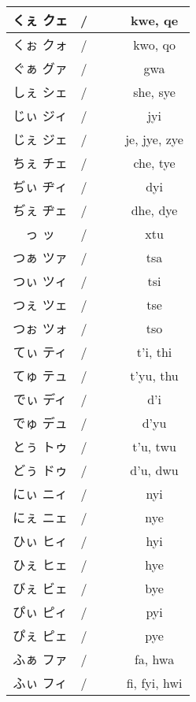\documentclass{article}
\begin{document}
\begin{center}
\begin{japanese}
\begin{longtable}{|c|c c c|c|}
                くぇ クェ & / &&& kwe, qe \\ \hline
                くぉ クォ & / &&& kwo, qo \\ \hline
                ぐぁ グァ & / &&& gwa \\ \hline
                しぇ シェ & / &&& she, sye \\ \hline
                じぃ ジィ & / &&& jyi \\ \hline
                じぇ ジェ & / &&& je, jye, zye \\ \hline
                ちぇ チェ & / &&& che, tye \\ \hline
                ぢぃ ヂィ & / &&& dyi \\ \hline
                ぢぇ ヂェ & / &&& dhe, dye \\ \hline
                っ ッ & / &&& xtu \\ \hline
                つぁ ツァ & / &&& tsa \\ \hline
                つぃ ツィ & / &&& tsi \\ \hline
                つぇ ツェ & / &&& tse \\ \hline
                つぉ ツォ & / &&& tso \\ \hline
                てぃ ティ & / &&& t'i, thi \\ \hline
                てゅ テュ & / &&& t'yu, thu \\ \hline
                でぃ ディ & / &&& d'i \\ \hline
                でゅ デュ & / &&& d'yu \\ \hline
                とぅ トゥ & / &&& t'u, twu \\ \hline
                どぅ ドゥ & / &&& d'u, dwu \\ \hline
                にぃ ニィ & / &&& nyi \\ \hline
                にぇ ニェ & / &&& nye \\ \hline
                ひぃ ヒィ & / &&& hyi \\ \hline
                ひぇ ヒェ & / &&& hye \\ \hline
                びぇ ビェ & / &&& bye \\ \hline
                ぴぃ ピィ & / &&& pyi \\ \hline
                ぴぇ ピェ & / &&& pye \\ \hline
                ふぁ ファ & / &&& fa, hwa \\ \hline
                ふぃ フィ & / &&& fi, fyi, hwi \\ \hline

\end{longtable}
\end{japanese}
\end{center}
\end{document}
